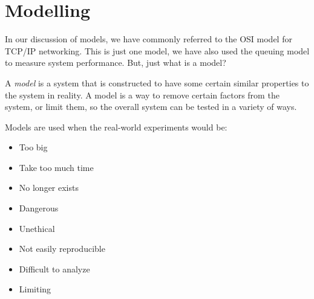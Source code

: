 \section{Modelling}\label{sec:Modelling}
In our discussion of models, we have commonly referred to the OSI model for TCP/IP networking.
This is just one model, we have also used the queuing model to measure system performance.
But, just what is a model?
\begin{definition}[Model]\label{def:Model}
  A \emph{model} is a system that is constructed to have some certain similar properties to the system in reality.
  A model is a way to remove certain factors from the system, or limit them, so the overall system can be tested in a variety of ways.
\end{definition}

Models are used when the real-world experiments would be:
\begin{itemize}[noitemsep]
\item Too big
\item Take too much time
\item No longer exists
\item Dangerous
\item Unethical
\item Not easily reproducible
\item Difficult to analyze
\item Limiting
\end{itemize}

